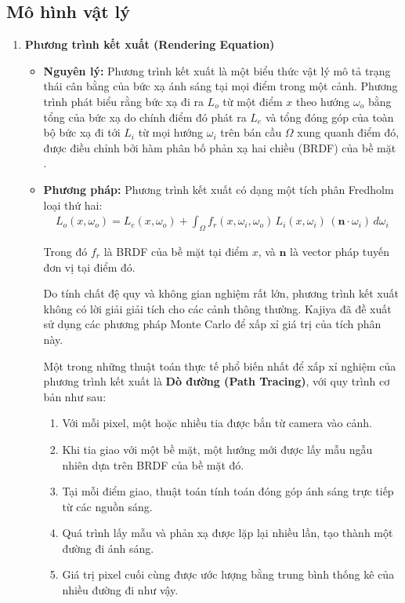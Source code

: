 \subsection{Mô hình vật lý}
\begin{enumerate}
	\item \textbf{Phương trình kết xuất (Rendering Equation)}
	\begin{itemize}
		\item \textbf{Nguyên lý:}  
		Phương trình kết xuất là một biểu thức vật lý mô tả trạng thái cân bằng của bức xạ ánh sáng tại mọi điểm trong một cảnh. Phương trình phát biểu rằng bức xạ đi ra $L_o$ từ một điểm $x$ theo hướng $\omega_o$ bằng tổng của bức xạ do chính điểm đó phát ra $L_e$ và tổng đóng góp của toàn bộ bức xạ đi tới $L_i$ từ mọi hướng $\omega_i$ trên bán cầu $\Omega$ xung quanh điểm đó, được điều chỉnh bởi hàm phân bố phản xạ hai chiều (BRDF) của bề mặt \cite{render_equa2}.
		
		\item \textbf{Phương pháp:}  
		Phương trình kết xuất có dạng một tích phân Fredholm loại thứ hai:
		\begin{gather*}
			L_o(x, \omega_o) = L_e(x, \omega_o)
			+ \int_{\Omega} f_r(x, \omega_i, \omega_o)\,
			L_i(x, \omega_i)\,
			(\mathbf{n} \cdot \omega_i)\, d\omega_i
		\end{gather*}
		
		Trong đó $f_r$ là BRDF của bề mặt tại điểm $x$, và $\mathbf{n}$ là vector pháp tuyến đơn vị tại điểm đó.
		
		Do tính chất đệ quy và không gian nghiệm rất lớn, phương trình kết xuất không có lời giải giải tích cho các cảnh thông thường. Kajiya đã đề xuất sử dụng các phương pháp Monte Carlo để xấp xỉ giá trị của tích phân này.
		
		Một trong những thuật toán thực tế phổ biến nhất để xấp xỉ nghiệm của phương trình kết xuất là \textbf{Dò đường (Path Tracing)}, với quy trình cơ bản như sau:
		\begin{enumerate}
			\item Với mỗi pixel, một hoặc nhiều tia được bắn từ camera vào cảnh.
			\item Khi tia giao với một bề mặt, một hướng mới được lấy mẫu ngẫu nhiên dựa trên BRDF của bề mặt đó.
			\item Tại mỗi điểm giao, thuật toán tính toán đóng góp ánh sáng trực tiếp từ các nguồn sáng.
			\item Quá trình lấy mẫu và phản xạ được lặp lại nhiều lần, tạo thành một đường đi ánh sáng.
			\item Giá trị pixel cuối cùng được ước lượng bằng trung bình thống kê của nhiều đường đi như vậy.
		\end{enumerate}
		

\end{itemize}
\end{enumerate}
